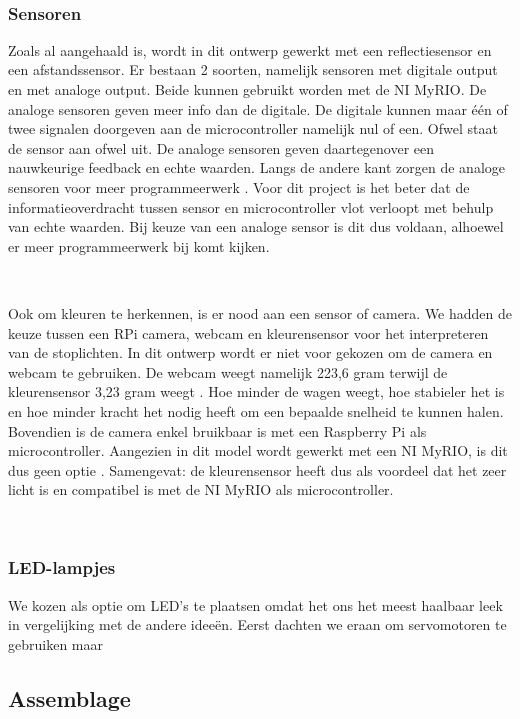 \documentclass[a4paper,twoside,kulak]{kulakreport} %
\begin{document}
~
\subsubsection{Sensoren}
Zoals al aangehaald is, wordt in dit ontwerp gewerkt met een reflectiesensor en een afstandssensor. Er bestaan 2 soorten, namelijk sensoren met digitale output en met analoge output. Beide kunnen gebruikt worden met de NI MyRIO. De analoge sensoren geven meer info dan de digitale. De digitale kunnen maar één of twee signalen doorgeven aan de microcontroller namelijk nul of een. Ofwel staat de sensor aan ofwel uit. De analoge sensoren geven daartegenover een nauwkeurige feedback en echte waarden. Langs de andere kant zorgen de analoge sensoren voor meer programmeerwerk \cite{DigitaalOfAnaloog}. Voor dit project is het beter dat de informatieoverdracht tussen sensor en microcontroller vlot verloopt met behulp van echte waarden. Bij keuze van een analoge sensor is dit dus voldaan, alhoewel er meer programmeerwerk bij komt kijken. %

~

Ook om kleuren te herkennen, is er nood aan een sensor of camera. We hadden de keuze tussen een RPi camera, webcam en kleurensensor voor het interpreteren van de stoplichten. In dit ontwerp wordt er niet voor gekozen om de camera en webcam te gebruiken. De webcam weegt namelijk 223,6 gram terwijl de kleurensensor 3,23 gram weegt \cite{Webcam,TCS34725KleurSensorBOB}. Hoe minder de wagen weegt, hoe stabieler het is en hoe minder kracht het nodig heeft om een bepaalde snelheid te kunnen halen. Bovendien is de camera enkel bruikbaar is met een Raspberry Pi als microcontroller. Aangezien in dit model wordt gewerkt met een NI MyRIO, is dit dus geen optie \cite{RPi-camera}. Samengevat: de kleurensensor heeft dus als voordeel dat het zeer licht is en compatibel is met de NI MyRIO als microcontroller.

~

\subsubsection{LED-lampjes}
We kozen als optie om LED's te plaatsen omdat het ons het meest haalbaar leek in vergelijking met de andere ideeën. Eerst dachten we eraan om servomotoren te gebruiken maar 

\subsection{Assemblage}
\end{document}
